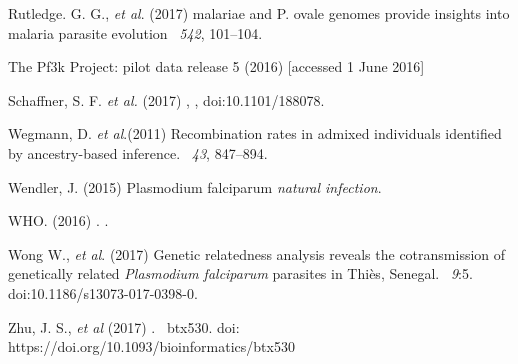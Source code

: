 \documentclass{article}
\begin{document}
\begin{thebibliography}{}
Rutledge. G. G., {\em et al}. (2017)
 malariae and P. ovale genomes provide insights into malaria parasite evolution
~{\em 542}, 101--104.


The Pf3k Project: pilot data release 5 (2016)
 [accessed 1 June 2016]


Schaffner, S. F. {\em et al.} (2017)
,
, doi:10.1101/188078.

Wegmann, D. {\em et al}.(2011)
\newblock Recombination rates in admixed individuals identified by ancestry-based inference.
~{\em 43\/}, 847--894.

Wendler, J. (2015)
 {P}lasmodium falciparum {\em natural infection}.

WHO. (2016)
.
.

Wong W., {\em et al}. (2017)
\newblock Genetic relatedness analysis reveals the cotransmission of genetically related {\it Plasmodium falciparum} parasites in Thiès, Senegal.
~{\em 9}:5. doi:10.1186/s13073-017-0398-0.

Zhu, J. S., {\em et al} (2017)
.
~{\em \/}btx530. doi: https://doi.org/10.1093/bioinformatics/btx530

\end{thebibliography}
\end{document}
